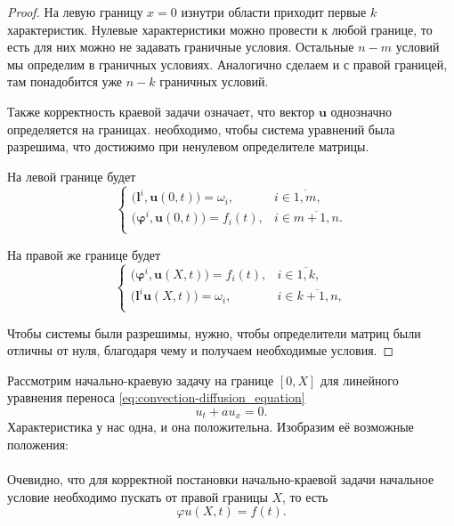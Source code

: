 \documentclass[../main.tex]{subfile}
\begin{document}
\begin{proof}
	На левую границу $x=0$ изнутри области приходит первые $k$
	характеристик. Нулевые характеристики можно провести к любой границе,
	то есть для них можно не задавать граничные условия. Остальные $n-m$
	условий мы определим в граничных условиях. Аналогично сделаем и с правой
	границей, там понадобится уже $n-k$ граничных условий.

	Также корректность краевой задачи означает, что вектор $\boldsymbol u$
	однозначно определяется на границах. необходимо, чтобы система уравнений
	была разрешима, что достижимо при ненулевом определителе матрицы.

	На левой границе будет
	\[
	\begin{cases}
		\big(\boldsymbol l^i,\boldsymbol u(0,t)
			\big)=\omega_i, &
			i\in\overline{1,m}, \\
		\big(\boldsymbol\varphi^i,
			\boldsymbol u(0,t)\big)=f_i(t),&
			i\in \overline{m+1,n}. \\
	\end{cases}
	\]

	На правой же границе будет
	\[
	\begin{cases}
		\big(\boldsymbol\varphi^i,
			\boldsymbol u(X,t)\big)=f_i(t),&
			i\in\overline{1,k}, \\
		\big(\boldsymbol l^i\boldsymbol u(X,t)
			\big)=\omega_i, &
			i\in\overline{k+1,n}, \\
	\end{cases}
	\]

	Чтобы системы были разрешимы, нужно, чтобы определители матриц были
	отличны от нуля, благодаря чему и получаем необходимые условия.
\end{proof}

\begin{example}
	Рассмотрим начально-краевую задачу на границе $[0,X]$ для линейного
	уравнения переноса \eqref{eq:convection-diffusion_equation}
	\[u_t+au_x=0.\]
	Характеристика у нас одна, и она положительна. Изобразим её возможные
	положения: \\

	 \\

	Очевидно, что для корректной постановки начально-краевой задачи
	начальное условие необходимо пускать от правой границы $X$, то есть
	\[\varphi u(X,t)=f(t).\]
\end{example}
\end{document}
